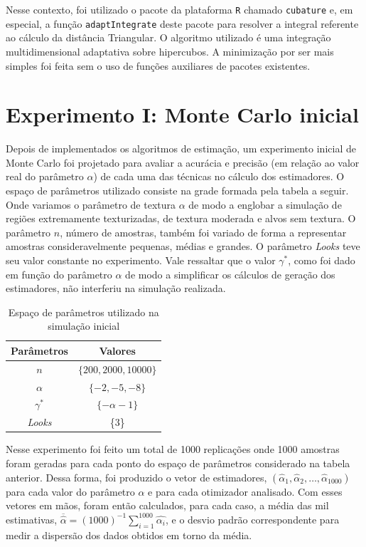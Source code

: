 Nesse contexto, foi utilizado o pacote da plataforma \texttt{R} chamado \texttt{cubature} e, em especial, a função \texttt{adaptIntegrate} deste pacote para resolver a integral referente ao cálculo da distância Triangular. O algoritmo utilizado é uma integração multidimensional adaptativa sobre hipercubos. A minimização por ser mais simples foi feita sem o uso de funções auxiliares de pacotes existentes.

\section{Experimento I: Monte Carlo inicial}

Depois de implementados os algoritmos de estimação, um experimento inicial de Monte Carlo foi projetado para avaliar a acurácia e precisão (em relação ao valor real do parâmetro $\alpha$) de cada uma das técnicas no cálculo dos estimadores. O espaço de parâmetros utilizado consiste na grade formada pela tabela a seguir. Onde variamos o parâmetro de textura $\alpha$ de modo a englobar a simulação de regiões extremamente texturizadas, de textura moderada e alvos sem textura. O parâmetro $n$, número de amostras, também foi variado de forma a representar amostras consideravelmente pequenas, médias e grandes. O parâmetro \textit{Looks} teve seu valor constante no experimento. Vale ressaltar que o valor $\gamma^{*}$, como foi dado em função do parâmetro $\alpha$ de modo a simplificar os cálculos de geração dos estimadores, não interferiu na simulação realizada.
\begin{table}[H]
\centering
\caption{Espaço de parâmetros utilizado na simulação inicial}
\smallskip
{}
\label{tab:tabela_parameters}
\begin{tabular}{c|c}
\toprule 
\multicolumn{1}{c|}{Parâmetros} & \multicolumn{1}{c}{Valores}  \\ 
\midrule
\rowcolor[gray]{.9} 
$n$ & $\{200, 2000, 10000\}$ \\ \hline
$\alpha$ & $\{-2, -5, -8\}$ \\ \hline
\rowcolor[gray]{.9} $\gamma^{*}$ & $\{-\alpha - 1\}$ \\ \hline
\textit{Looks} & \{3\} \\ 
\bottomrule
\end{tabular}
\end{table}

Nesse experimento foi feito um total de 1000 replicações onde 1000 amostras foram geradas para cada ponto do espaço de parâmetros considerado na tabela anterior. Dessa forma, foi produzido o vetor de estimadores, $(\widehat{\alpha}_{1}, \widehat{\alpha}_{2}, \dots, \widehat{\alpha}_{1000})$ para cada valor do parâmetro $\alpha$ e para cada otimizador analisado. Com esses vetores em mãos, foram então calculados, para cada caso, a média das mil estimativas, $ \overline{\widehat{\alpha}} = (1000)^{-1} \sum_{i=1}^{1000} \widehat{\alpha_{i}} $, e o desvio padrão correspondente para medir a dispersão dos dados obtidos em torno da média. 

